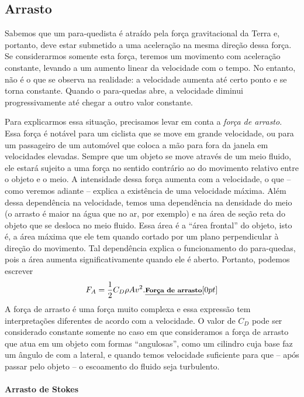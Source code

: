 \subsection{Arrasto}

Sabemos que um para-quedista é atraído pela força gravitacional da Terra e, portanto, deve estar submetido a uma aceleração na mesma direção dessa força. Se considerarmos somente esta força, teremos um movimento com aceleração constante, levando a um aumento linear da velocidade com o tempo. No entanto, não é o que se observa na realidade: a velocidade aumenta até certo ponto e se torna constante. Quando o para-quedas abre, a velocidade diminui progressivamente até chegar a outro valor constante.

Para explicarmos essa situação, precisamos levar em conta a \emph{força de arrasto}. Essa força é notável para um ciclista que se move em grande velocidade, ou para um passageiro de um automóvel que coloca a mão para fora da janela em velocidades elevadas. Sempre que um objeto se move através de um meio fluido, ele estará sujeito a uma força no sentido contrário ao do movimento relativo entre o objeto e o meio. A intensidade dessa força aumenta com a velocidade, o que -- como veremos adiante -- explica a existência de uma velocidade máxima. Além dessa dependência na velocidade, temos uma dependência na densidade do meio (o arrasto é maior na água que no ar, por exemplo) e na área de seção reta do objeto que se desloca no meio fluido. Essa área é a ``área frontal'' do objeto, isto é, a área máxima que ele tem quando cortado por um plano perpendicular à direção do movimento. Tal dependência explica o funcionamento do para-quedas, pois a área aumenta significativamente quando ele é aberto. Portanto, podemos escrever
\begin{equation}\label{Eq:ExpPadraoArrasto}
  F_A = \frac{1}{2}C_D \rho A v^2. \relax{\footnotesize\emph{\textbf{Força de arrasto}}}[0pt]
\end{equation}
%
 A força de arrasto é uma força muito complexa e essa expressão tem interpretações diferentes de acordo com a velocidade. O valor de $C_D$ pode ser considerado constante somente no caso em que consideramos a força de arrasto que atua em um objeto com formas ``angulosas'', como um cilindro cuja base faz um ângulo de  com a lateral, e quando temos velocidade suficiente para que -- após passar pelo objeto -- o escoamento do fluido seja turbulento. 

\paragraph{Arrasto de Stokes}

